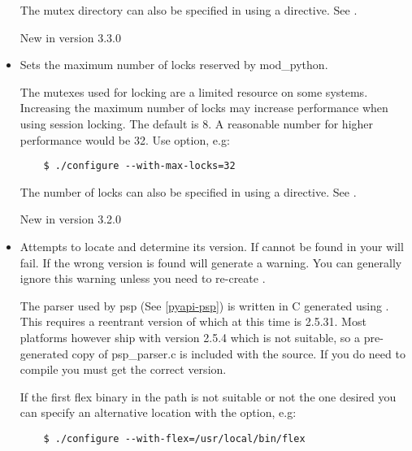 \begin{itemize}
  The mutex directory can also be specified in using a 
   directive. 
  See .

  New in version 3.3.0

\item
  Sets the maximum number of locks reserved by mod_python.

  The mutexes used for locking are a limited resource on some
  systems. Increasing the maximum number of locks may increase performance
  when using session locking.  The default is 8. A reasonable number for 
  higher performance would be 32.
  Use  option, e.g:

  \begin{verbatim}
    $ ./configure --with-max-locks=32
  \end{verbatim}                      

  The number of locks can also be specified in using a 
   directive. 
  See .

  New in version 3.2.0

\item
  Attempts to locate  and determine its version. 
  If  cannot be found in your  
  will fail.  If the wrong version is found  will generate a warning.
  You can generally ignore this warning unless you need to re-create
  .
 
  The parser used by psp (See \ref{pyapi-psp}) is written in C generated using 
  . This requires a reentrant version of  which
  at this time is 2.5.31. Most platforms however ship with version 2.5.4
  which is not suitable, so a pre-generated copy of psp_parser.c is included
  with the source. If you do need to compile  you 
  must get the correct  version.
 
  If the first flex binary in the path is not suitable or not the one desired
  you can specify an alternative location with the 
  option, e.g:
 
  \begin{verbatim}
    $ ./configure --with-flex=/usr/local/bin/flex
  \end{verbatim}


\end{itemize}

